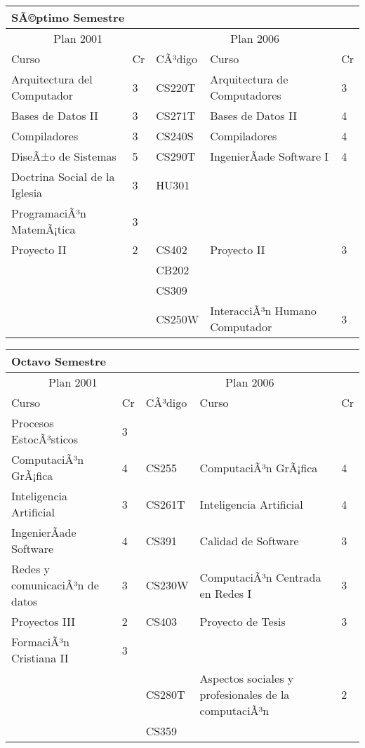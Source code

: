 \begin{center}
\begin{tabularx}{0.95\textwidth}{|p{4cm}|p{1cm}||p{2cm}|X|p{1cm}|}\hline
\multicolumn{5}{|l|}{\textbf{SÃ©ptimo Semestre}} \\ \hline
\multicolumn{2}{|c|}{Plan 2001} & \multicolumn{3}{|c|}{Plan 2006} \\ \hline
Curso & Cr & CÃ³digo & Curso & Cr \\ \hline
Arquitectura del Computador & 3 & CS220T & Arquitectura de Computadores & 3 \\ \hline
Bases de Datos II & 3 & CS271T & Bases de Datos II & 4 \\ \hline
Compiladores & 3 & CS240S & Compiladores & 4 \\ \hline
DiseÃ±o de Sistemas & 5 & CS290T & IngenierÃ­ade Software I & 4 \\ \hline
Doctrina Social de la Iglesia & 3 & HU301 &  & \\ \hline
ProgramaciÃ³n MatemÃ¡tica & 3 &  &  & \\ \hline
Proyecto II & 2 & CS402 & Proyecto II & 3 \\ \hline
 &  & CB202 &  & \\ \hline
 &  & CS309 &  & \\ \hline
 &  & CS250W & InteracciÃ³n Humano Computador & 3 \\ \hline
\end{tabularx}
\end{center}

\begin{center}
\begin{tabularx}{0.95\textwidth}{|p{4cm}|p{1cm}||p{2cm}|X|p{1cm}|}\hline
\multicolumn{5}{|l|}{\textbf{Octavo Semestre}} \\ \hline
\multicolumn{2}{|c|}{Plan 2001} & \multicolumn{3}{|c|}{Plan 2006} \\ \hline
Curso & Cr & CÃ³digo & Curso & Cr \\ \hline
Procesos EstocÃ³sticos & 3 &  &  & \\ \hline
ComputaciÃ³n GrÃ¡fica & 4 & CS255 & ComputaciÃ³n GrÃ¡fica & 4 \\ \hline
Inteligencia Artificial & 3 & CS261T & Inteligencia Artificial & 4 \\ \hline
IngenierÃ­ade Software & 4 & CS391 & Calidad de Software & 3 \\ \hline
Redes y comunicaciÃ³n de datos & 3 & CS230W & ComputaciÃ³n Centrada en Redes I & 3 \\ \hline
Proyectos III & 2 & CS403 & Proyecto de Tesis & 3 \\ \hline
FormaciÃ³n Cristiana II & 3 &  &  & \\ \hline
 &  & CS280T & Aspectos sociales y profesionales de la computaciÃ³n& 2 \\ \hline
 &  & CS359 &  & \\ \hline
\end{tabularx}
\end{center}

